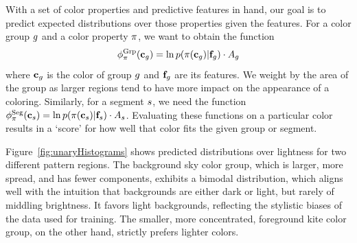 With a set of color properties and predictive features in hand, our goal is to predict expected distributions over those properties given the features. For a color group $g$ and a color property $\pi$, we want to obtain the function
\begin{equation*}
\phi^{\textrm{Grp}}_\pi(\mathbf{c}_g) =  \ln p( \pi( \mathbf{c}_g ) | \mathbf{f}_g ) \cdot A_g
\end{equation*}
where $\mathbf{c}_g$ is the color of group $g$ and $\mathbf{f}_g$ are its features. We weight by the area of the group as larger regions tend to have more impact on the appearance of a coloring. Similarly, for a segment $s$, we need the function $\phi^{\textrm{Seg}}_\pi(\mathbf{c}_s) = \ln p( \pi( \mathbf{c}_s ) | \mathbf{f}_s) \cdot A_s$. Evaluating these functions on a particular color results in a `score' for how well that color fits the given group or segment.

Figure~\ref{fig:unaryHistograms} shows predicted distributions over lightness for two different pattern regions. The background sky color group, which is larger, more spread, and has fewer components, exhibits a bimodal distribution, which aligns well with the intuition that backgrounds are either dark or light, but rarely of middling brightness. It favors light backgrounds, reflecting the stylistic biases of the data used for training. The smaller, more concentrated, foreground kite color group, on the other hand, strictly prefers lighter colors.

